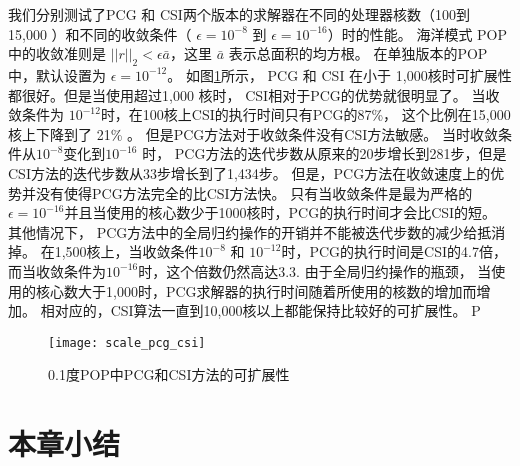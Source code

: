 我们分别测试了PCG 和 CSI两个版本的求解器在不同的处理器核数（100到 15,000 ）和不同的收敛条件（ $\epsilon = 10^{-8}$ 到 $\epsilon = 10^{-16}$）时的性能。
海洋模式 POP 中的收敛准则是 $||r||_2<\epsilon \bar{a}$，这里 $\bar{a}$ 表示总面积的均方根。 
在单独版本的POP中，默认设置为 $\epsilon = 10^{-12}$。 
如图\ref{fig:scale}所示， PCG 和 CSI 在小于  1,000核时可扩展性都很好。但是当使用超过1,000 核时， CSI相对于PCG的优势就很明显了。 
当收敛条件为 $10^{-12}$时，在100核上CSI的执行时间只有PCG的87\%， 这个比例在15,000核上下降到了 21\% 。
但是PCG方法对于收敛条件没有CSI方法敏感。 
当时收敛条件从$10^{-8}$变化到$10^{-16}$ 时， PCG方法的迭代步数从原来的20步增长到281步，但是CSI方法的迭代步数从33步增长到了1,434步。 
但是，PCG方法在收敛速度上的优势并没有使得PCG方法完全的比CSI方法快。 
只有当收敛条件是最为严格的$\epsilon = 10^{-16}$并且当使用的核心数少于1000核时，PCG的执行时间才会比CSI的短。
其他情况下， PCG方法中的全局归约操作的开销并不能被迭代步数的减少给抵消掉。
在1,500核上，当收敛条件$10^{-8}$ 和 $10^{-12}$时，PCG的执行时间是CSI的4.7倍， 而当收敛条件为$10^{-16}$时，这个倍数仍然高达3.3. 
由于全局归约操作的瓶颈， 当使用的核心数大于1,000时，PCG求解器的执行时间随着所使用的核数的增加而增加。 
相对应的，CSI算法一直到10,000核以上都能保持比较好的可扩展性。 
P 

\begin {figure}
\centering
\texttt{[image: scale\_pcg\_csi]}
\caption []{ 0.1度POP中PCG和CSI方法的可扩展性 \label {fig:scale}}
\end {figure}


 

 

\section{本章小结}
\label{solver:Conclusion}

